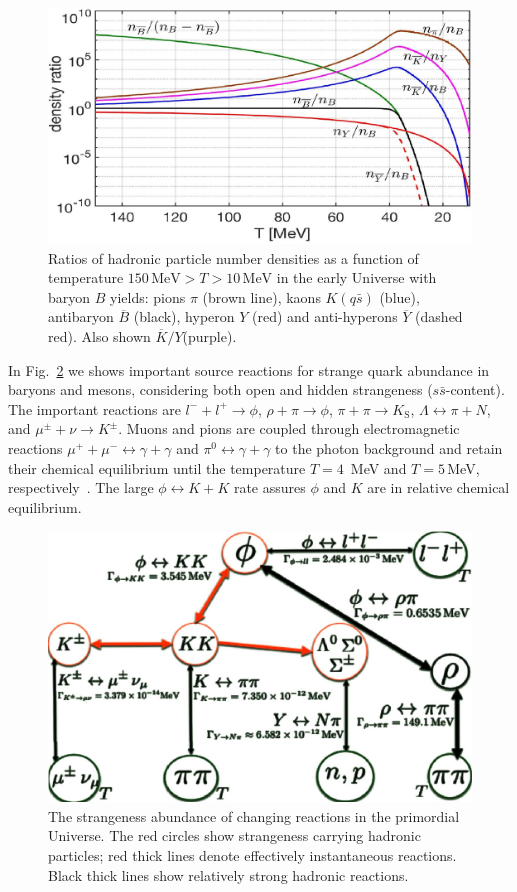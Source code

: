 \documentclass[universe,article,submit,moreauthors,pdftex,a4paper]{Definitions/mdpi}
\begin{document}
\begin{figure}[bt]
\centering
\includegraphics[width=0.7\linewidth]{Meson_Baryon_density_ratio_C.jpg}
\caption{Ratios of hadronic particle number densities as a function of temperature $150\,\mathrm{MeV}> T>10\,\mathrm{MeV}$ in the early Universe with baryon $B$ yields: pions $\pi$ (brown line), kaons $K( q\bar s)$ (blue), antibaryon $\overline B$ (black), hyperon $Y$ (red) and anti-hyperons $\overline Y$ (dashed red). Also shown $\overline K/Y$(purple).}
\label{EquilibPartRatiosFig}
\end{figure}
In Fig.~\ref{Strangeness_map2} we shows important source reactions for  strange quark abundance in baryons and mesons, considering both open and hidden strangeness ($s\bar s$-content). The important reactions are $l^-+l^+\rightarrow\phi$, $\rho+\pi\rightarrow\phi$, $\pi+\pi\rightarrow K_\mathrm{S}$, $\Lambda \leftrightarrow \pi+ N$, and $\mu^\pm+\nu\rightarrow K^\pm$. Muons and pions are coupled through electromagnetic reactions $\mu^++\mu^-\leftrightarrow\gamma+\gamma$ and $\pi^0\leftrightarrow\gamma+\gamma$ to the photon background and retain their chemical equilibrium until the temperature $T =4$\, MeV and $T=5$\,MeV, respectively~\cite{Rafelski:2021aey,Kuznetsova:2008jt}. The large $\phi\leftrightarrow K+K$ rate assures $\phi$ and $K$ are in relative chemical equilibrium. 
\begin{figure} %
\centering
\includegraphics[width=0.60\linewidth]{Strangeness002_newJ.jpg}
\caption{
The strangeness abundance of changing reactions in the primordial Universe. The red circles show strangeness carrying hadronic particles; red thick lines denote effectively instantaneous reactions. Black thick lines show relatively strong hadronic reactions.}
\label{Strangeness_map2}
\end{figure}
\end{document}
